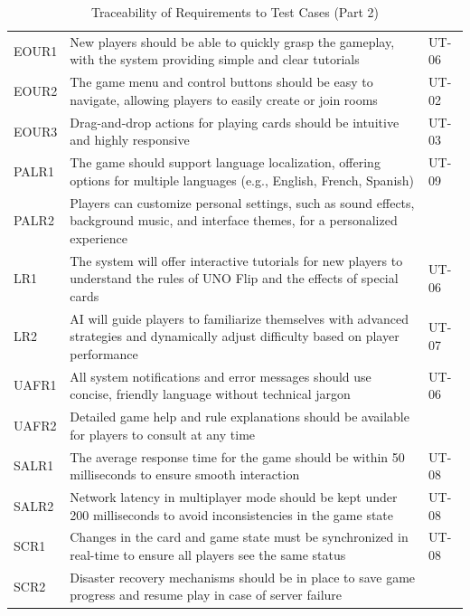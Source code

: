 \documentclass[12pt, titlepage]{article}
\begin{document}
\begin{table}[H]
    \centering
    \begin{tabularx}{\textwidth}{|l|X|l|}
        \hline
        EOUR1 & New players should be able to quickly grasp the gameplay, with the system providing simple and clear tutorials & UT-06 \\
        EOUR2 & The game menu and control buttons should be easy to navigate, allowing players to easily create or join rooms & UT-02 \\
        EOUR3 & Drag-and-drop actions for playing cards should be intuitive and highly responsive & UT-03 \\
        PALR1 & The game should support language localization, offering options for multiple languages (e.g., English, French, Spanish) & UT-09 \\
        PALR2 & Players can customize personal settings, such as sound effects, background music, and interface themes, for a personalized experience &  \\
        LR1 & The system will offer interactive tutorials for new players to understand the rules of UNO Flip and the effects of special cards & UT-06 \\
        LR2 & AI will guide players to familiarize themselves with advanced strategies and dynamically adjust difficulty based on player performance & UT-07 \\
        UAFR1 & All system notifications and error messages should use concise, friendly language without technical jargon & UT-06 \\
        UAFR2 & Detailed game help and rule explanations should be available for players to consult at any time &  \\
        SALR1 & The average response time for the game should be within 50 milliseconds to ensure smooth interaction & UT-08 \\
        SALR2 & Network latency in multiplayer mode should be kept under 200 milliseconds to avoid inconsistencies in the game state & UT-08 \\
        SCR1 & Changes in the card and game state must be synchronized in real-time to ensure all players see the same status & UT-08 \\
        SCR2 & Disaster recovery mechanisms should be in place to save game progress and resume play in case of server failure &  \\
        \hline
    \end{tabularx}
    \caption{Traceability of Requirements to Test Cases (Part 2)}
    \label{tab:trace_requirements_2}
\end{table}
\end{document}
